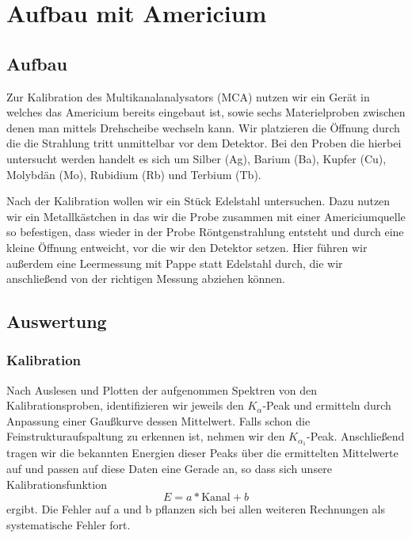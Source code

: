 \documentclass[a4paper,14pt]{article}
\begin{document}
\section{Aufbau mit Americium}
\subsection{Aufbau}
Zur Kalibration des Multikanalanalysators (MCA) nutzen wir ein Gerät in welches das Americium bereits eingebaut ist, sowie sechs Materielproben zwischen denen man mittels Drehscheibe wechseln kann. Wir platzieren die Öffnung durch die die Strahlung tritt unmittelbar vor dem Detektor.
Bei den Proben die hierbei untersucht werden handelt es sich um Silber (Ag), Barium (Ba), Kupfer (Cu), Molybdän (Mo), Rubidium (Rb) und Terbium (Tb).

Nach der Kalibration wollen wir ein Stück Edelstahl untersuchen. Dazu nutzen wir ein Metallkästchen in das wir die Probe zusammen mit einer Americiumquelle so befestigen, dass wieder in der Probe Röntgenstrahlung entsteht und durch eine kleine Öffnung entweicht, vor die wir den Detektor setzen. Hier führen wir außerdem eine Leermessung mit Pappe statt Edelstahl durch, die wir anschließend von der richtigen Messung abziehen können.

\subsection{Auswertung}
\subsubsection{Kalibration}
Nach Auslesen und Plotten der aufgenommen Spektren von den Kalibrationsproben, identifizieren wir jeweils den $K_\alpha$-Peak und ermitteln durch Anpassung einer Gaußkurve dessen Mittelwert. Falls schon die Feinstrukturaufspaltung zu erkennen ist, nehmen wir den $K_{\alpha_1}$-Peak. Anschließend tragen wir die bekannten Energien dieser Peaks über die ermittelten Mittelwerte auf und passen auf diese Daten eine Gerade an, so dass sich unsere Kalibrationsfunktion
\begin{equation}
	E = a * \mathrm{Kanal} + b
\end{equation}
ergibt. Die Fehler auf a und b pflanzen sich bei allen weiteren Rechnungen als systematische Fehler fort.
\end{document}
